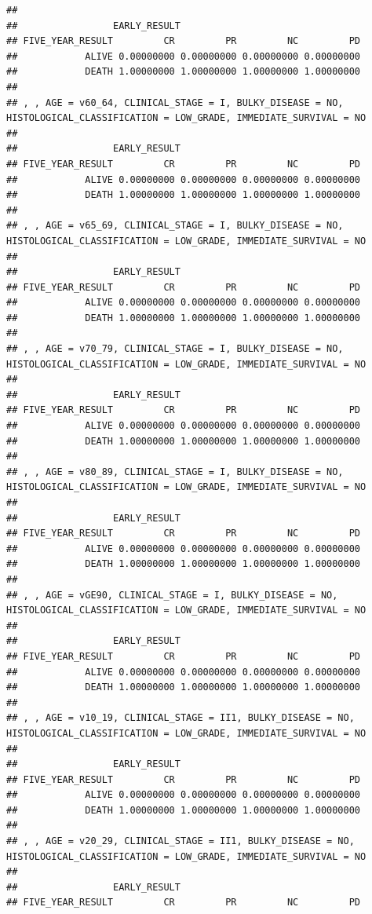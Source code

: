 \documentclass[]{article}
\begin{document}
\begin{verbatim}
## 
##                 EARLY_RESULT
## FIVE_YEAR_RESULT         CR         PR         NC         PD
##            ALIVE 0.00000000 0.00000000 0.00000000 0.00000000
##            DEATH 1.00000000 1.00000000 1.00000000 1.00000000
## 
## , , AGE = v60_64, CLINICAL_STAGE = I, BULKY_DISEASE = NO, HISTOLOGICAL_CLASSIFICATION = LOW_GRADE, IMMEDIATE_SURVIVAL = NO
## 
##                 EARLY_RESULT
## FIVE_YEAR_RESULT         CR         PR         NC         PD
##            ALIVE 0.00000000 0.00000000 0.00000000 0.00000000
##            DEATH 1.00000000 1.00000000 1.00000000 1.00000000
## 
## , , AGE = v65_69, CLINICAL_STAGE = I, BULKY_DISEASE = NO, HISTOLOGICAL_CLASSIFICATION = LOW_GRADE, IMMEDIATE_SURVIVAL = NO
## 
##                 EARLY_RESULT
## FIVE_YEAR_RESULT         CR         PR         NC         PD
##            ALIVE 0.00000000 0.00000000 0.00000000 0.00000000
##            DEATH 1.00000000 1.00000000 1.00000000 1.00000000
## 
## , , AGE = v70_79, CLINICAL_STAGE = I, BULKY_DISEASE = NO, HISTOLOGICAL_CLASSIFICATION = LOW_GRADE, IMMEDIATE_SURVIVAL = NO
## 
##                 EARLY_RESULT
## FIVE_YEAR_RESULT         CR         PR         NC         PD
##            ALIVE 0.00000000 0.00000000 0.00000000 0.00000000
##            DEATH 1.00000000 1.00000000 1.00000000 1.00000000
## 
## , , AGE = v80_89, CLINICAL_STAGE = I, BULKY_DISEASE = NO, HISTOLOGICAL_CLASSIFICATION = LOW_GRADE, IMMEDIATE_SURVIVAL = NO
## 
##                 EARLY_RESULT
## FIVE_YEAR_RESULT         CR         PR         NC         PD
##            ALIVE 0.00000000 0.00000000 0.00000000 0.00000000
##            DEATH 1.00000000 1.00000000 1.00000000 1.00000000
## 
## , , AGE = vGE90, CLINICAL_STAGE = I, BULKY_DISEASE = NO, HISTOLOGICAL_CLASSIFICATION = LOW_GRADE, IMMEDIATE_SURVIVAL = NO
## 
##                 EARLY_RESULT
## FIVE_YEAR_RESULT         CR         PR         NC         PD
##            ALIVE 0.00000000 0.00000000 0.00000000 0.00000000
##            DEATH 1.00000000 1.00000000 1.00000000 1.00000000
## 
## , , AGE = v10_19, CLINICAL_STAGE = II1, BULKY_DISEASE = NO, HISTOLOGICAL_CLASSIFICATION = LOW_GRADE, IMMEDIATE_SURVIVAL = NO
## 
##                 EARLY_RESULT
## FIVE_YEAR_RESULT         CR         PR         NC         PD
##            ALIVE 0.00000000 0.00000000 0.00000000 0.00000000
##            DEATH 1.00000000 1.00000000 1.00000000 1.00000000
## 
## , , AGE = v20_29, CLINICAL_STAGE = II1, BULKY_DISEASE = NO, HISTOLOGICAL_CLASSIFICATION = LOW_GRADE, IMMEDIATE_SURVIVAL = NO
## 
##                 EARLY_RESULT
## FIVE_YEAR_RESULT         CR         PR         NC         PD

\end{verbatim}
\end{document}
